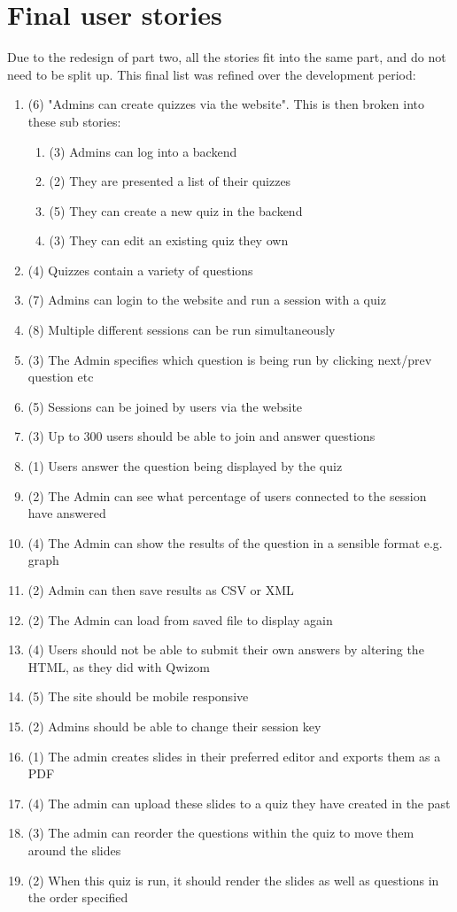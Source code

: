 \newpage

\section{Final user stories}
\label{appendix:final-stories}
Due to the redesign of part two, all the stories fit into the same part, and do not need to be split up. This final list was refined over the development period:
\begin{enumerate}
	\item (6) "Admins can create quizzes via the website". This is then broken into these sub stories:
	\begin{enumerate}
		\item (3) Admins can log into a backend
		\item (2) They are presented a list of their quizzes
		\item (5) They can create a new quiz in the backend
		\item (3) They can edit an existing quiz they own
	\end{enumerate}
	\item (4) Quizzes contain a variety of questions
	\item (7) Admins can login to the website and run a session with a quiz
	\item (8) Multiple different sessions can be run simultaneously
	\item (3) The Admin specifies which question is being run by clicking next/prev question etc
	\item (5) Sessions can be joined by users via the website
	\item (3) Up to 300 users should be able to join and answer questions
	\item (1) Users answer the question being displayed by the quiz
	\item (2) The Admin can see what percentage of users connected to the session have answered
	\item (4) The Admin can show the results of the question in a sensible format e.g. graph
	\item (2) Admin can then save results as CSV or XML
	\item (2) The Admin can load from saved file to display again
	\item (4) Users should not be able to submit their own answers by altering the HTML, as they did with Qwizom
	\item (5) The site should be mobile responsive
	\item (2) Admins should be able to change their session key
	\item (1) The admin creates slides in their preferred editor and exports them as a PDF
	\item (4) The admin can upload these slides to a quiz they have created in the past
	\item (3) The admin can reorder the questions within the quiz to move them around the slides
	\item (2) When this quiz is run, it should render the slides as well as questions in the order specified
\end{enumerate}
